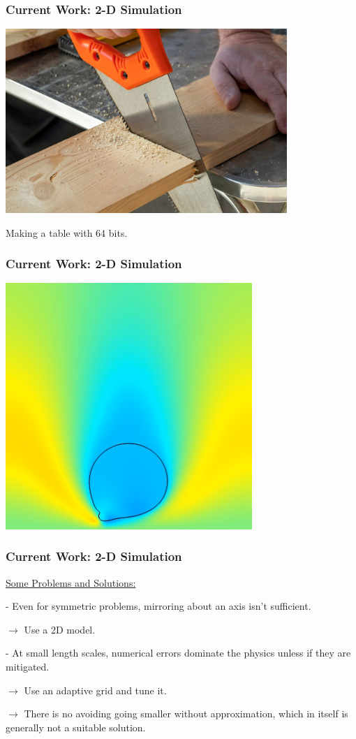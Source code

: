 \documentclass[12pt]{beamer}
\begin{document}
\begin{frame}
    \frametitle{Current Work: 2-D Simulation}

    \includegraphics[width=0.8\textwidth]{img/cuttingwood.jpg}

    Making a table with 64 bits.
\end{frame}
\begin{frame}
    \frametitle{Current Work: 2-D Simulation}

    \includegraphics[width=0.7\textwidth]{img/10-assymetry.png}
\end{frame}
\begin{frame}
    \frametitle{Current Work: 2-D Simulation}
    \underline{Some Problems and Solutions:}

    - Even for symmetric problems, mirroring about an axis isn't sufficient.

    $\rightarrow$ Use a 2D model.

    - At small length scales, numerical errors dominate the physics unless if 
    they are mitigated.

    $\rightarrow$ Use an adaptive grid and tune it.
    
    $\rightarrow$ There is no avoiding going smaller without approximation, 
    which in itself is generally not a suitable solution.
\end{frame}
\end{document}
